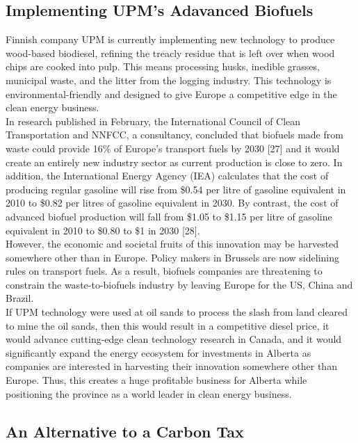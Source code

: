 \documentclass[11pt]{article}
\begin{document}
\subsection{Implementing UPM's Adavanced Biofuels}

Finnish company UPM is currently implementing new technology to produce wood-based biodiesel, refining the treacly residue that is left over when wood chips are cooked into pulp. This means processing husks, inedible grasses, municipal waste, and the litter from the logging industry. This technology is environmental-friendly and designed to give Europe a competitive edge in the clean energy business. \\

In research published in February, the International Council of Clean Transportation and NNFCC, a consultancy, concluded that biofuels made from waste could provide 16\% of Europe's transport fuels by 2030 [27] and it would create an entirely new industry sector as current production is close to zero. In addition, the International Energy Agency (IEA) calculates that the cost of producing regular gasoline will rise from \$0.54 per litre of gasoline equivalent in 2010 to \$0.82 per litres of gasoline equivalent in 2030. By contrast, the cost of advanced biofuel production will fall from \$1.05 to \$1.15 per litre of gasoline equivalent in 2010 to \$0.80 to \$1 in 2030 [28].\\

However, the economic and societal fruits of this innovation may be harvested somewhere other than in Europe. Policy makers in Brussels are now sidelining rules on transport fuels. As a result, biofuels companies are threatening to constrain the waste-to-biofuels industry by leaving Europe for the US, China and Brazil.  \\

If UPM technology were used at oil sands to process the slash from land cleared to mine the oil sands, then this would result in a competitive diesel price, it would advance cutting-edge clean technology research in Canada, and it would significantly expand the energy ecosystem for investments in Alberta as companies are interested in harvesting their innovation somewhere other than Europe. Thus, this creates a huge profitable business for Alberta while positioning the province as a world leader in clean energy business.  


\subsection{An Alternative to a Carbon Tax}
\end{document}
